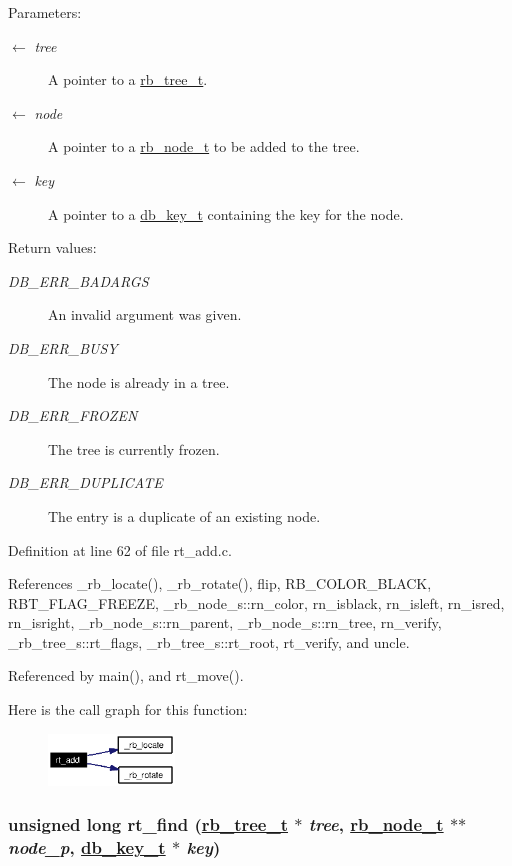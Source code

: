 \begin{Desc}
\item[Parameters:]
\begin{description}
\item[\mbox{$\leftarrow$} {\em tree}]A pointer to a \hyperlink{group__dbprim__rbtree_ga0}{rb\_\-tree\_\-t}. \item[\mbox{$\leftarrow$} {\em node}]A pointer to a \hyperlink{group__dbprim__rbtree_ga1}{rb\_\-node\_\-t} to be added to the tree. \item[\mbox{$\leftarrow$} {\em key}]A pointer to a \hyperlink{group__dbprim_ga0}{db\_\-key\_\-t} containing the key for the node.\end{description}
\end{Desc}
\begin{Desc}
\item[Return values:]
\begin{description}
\item[{\em DB\_\-ERR\_\-BADARGS}]An invalid argument was given. \item[{\em DB\_\-ERR\_\-BUSY}]The node is already in a tree. \item[{\em DB\_\-ERR\_\-FROZEN}]The tree is currently frozen. \item[{\em DB\_\-ERR\_\-DUPLICATE}]The entry is a duplicate of an existing node.\end{description}
\end{Desc}


Definition at line 62 of file rt\_\-add.c.

References \_\-rb\_\-locate(), \_\-rb\_\-rotate(), flip, RB\_\-COLOR\_\-BLACK, RBT\_\-FLAG\_\-FREEZE, \_\-rb\_\-node\_\-s::rn\_\-color, rn\_\-isblack, rn\_\-isleft, rn\_\-isred, rn\_\-isright, \_\-rb\_\-node\_\-s::rn\_\-parent, \_\-rb\_\-node\_\-s::rn\_\-tree, rn\_\-verify, \_\-rb\_\-tree\_\-s::rt\_\-flags, \_\-rb\_\-tree\_\-s::rt\_\-root, rt\_\-verify, and uncle.

Referenced by main(), and rt\_\-move().

Here is the call graph for this function:\begin{figure}[H]
\begin{center}
\leavevmode
\includegraphics[width=95pt]{group__dbprim__rbtree_ga6_cgraph}
\end{center}
\end{figure}
\hypertarget{group__dbprim__rbtree_ga9}{
\subsubsection[rt\_\-find]{\setlength{\rightskip}{0pt plus 5cm}unsigned long rt\_\-find (\hyperlink{struct__rb__tree__s}{rb\_\-tree\_\-t} $\ast$ {\em tree}, \hyperlink{struct__rb__node__s}{rb\_\-node\_\-t} $\ast$$\ast$ {\em node\_\-p}, \hyperlink{struct__db__key__s}{db\_\-key\_\-t} $\ast$ {\em key})}}
\label{group__dbprim__rbtree_ga9}


